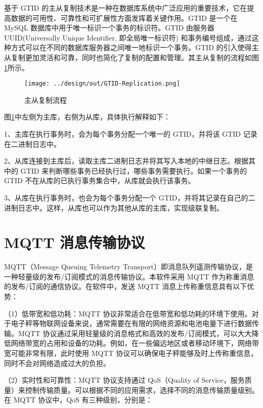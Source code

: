 基于 GTID 的主从复制技术是一种在数据库系统中广泛应用的重要技术，它在提高数据的可用性、可靠性和可扩展性方面发挥着关键作用。GTID 是一个在 MySQL 数据库中用于唯一标识一个事务的标识符。GTID 由服务器 UUID(Universally Unique Identifier, 即全局唯一标识符) 和事务编号组成，通过这种方式可以在不同的数据库服务器之间唯一地标识一个事务。GTID 的引入使得主从复制更加灵活和可靠，同时也简化了复制的配置和管理。其主从复制的流程如图\ref{fig:GTID-Replication}所示。

\begin{figure}[H]
    \centering
    \texttt{[image: ../design/out/GTID-Replication.png]}
    \caption{主从复制流程}
    \label{fig:GTID-Replication}
\end{figure}

图\ref{fig:GTID-Replication}中左侧为主库，右侧为从库，具体执行解释如下：

1、主库在执行事务时，会为每个事务分配一个唯一的 GTID，并将该 GTID 记录在二进制日志中。

2、从库连接到主库后，读取主库二进制日志并将其写入本地的中继日志。根据其中的 GTID 来判断哪些事务已经执行过，哪些事务需要执行。如果一个事务的 GTID 不在从库的已执行事务集合中，从库就会执行该事务。

3、从库在执行事务时，也会为每个事务分配一个 GTID，并将其记录在自己的二进制日志中。这样，从库也可以作为其他从库的主库，实现级联复制\cite{MySQL-Liu2022}。

\section{MQTT 消息传输协议}\label{sec:mqtt}

MQTT（Message Queuing Telemetry Transport）即消息队列遥测传输协议，是一种轻量级的发布/订阅模式的消息传输协议。本软件采用 MQTT 作为称重消息的发布/订阅的通信协议。在软件中，发送 MQTT 消息上传称重信息具有以下优势：

（1）低带宽和低功耗：MQTT 协议非常适合在低带宽和低功耗的环境下使用。对于电子秤等物联网设备来说，通常需要在有限的网络资源和电池电量下进行数据传输。MQTT 协议通过采用轻量级的消息格式和高效的发布/订阅模式，可以大大降低网络带宽的占用和设备的功耗。例如，在一些偏远地区或者移动环境下，网络带宽可能非常有限，此时使用 MQTT 协议可以确保电子秤能够及时上传称重信息，同时不会对网络造成过大的负担\cite{Jia2015}。

（2）实时性和可靠性：MQTT 协议支持通过 QoS（Quality of Service，服务质量）来控制传输质量。可以根据不同的应用需求，选择不同的消息传输质量级别。在 MQTT 协议中，QoS 有三种级别\cite{Jia2015}，分别是：

